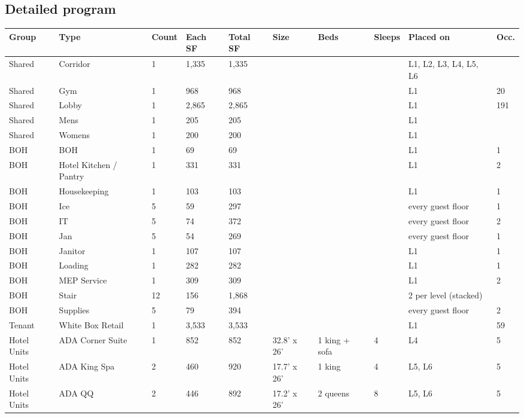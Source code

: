 \documentclass[10pt]{article}
\begin{document}
\subsection{Detailed program}
{\small \begin{longtable}{p{1.4cm}p{3.0cm}p{0.8cm}p{1.0cm}p{1.1cm}p{1.6cm}p{1.6cm}p{0.9cm}p{2.2cm}p{0.7cm}}
\toprule
\textbf{Group} & \textbf{Type} & \textbf{Count} & \textbf{Each SF} & \textbf{Total SF} & \textbf{Size} & \textbf{Beds} & \textbf{Sleeps} & \textbf{Placed on} & \textbf{Occ.} \\ \midrule \endhead
Shared & Corridor & 1 & 1,335 & 1,335 &  &  &  & L1, L2, L3, L4, L5, L6 &  \\
Shared & Gym & 1 & 968 & 968 &  &  &  & L1 & 20 \\
Shared & Lobby & 1 & 2,865 & 2,865 &  &  &  & L1 & 191 \\
Shared & Mens & 1 & 205 & 205 &  &  &  & L1 &  \\
Shared & Womens & 1 & 200 & 200 &  &  &  & L1 &  \\
BOH & BOH & 1 & 69 & 69 &  &  &  & L1 & 1 \\
BOH & Hotel Kitchen / Pantry & 1 & 331 & 331 &  &  &  & L1 & 2 \\
BOH & Housekeeping & 1 & 103 & 103 &  &  &  & L1 & 1 \\
BOH & Ice & 5 & 59 & 297 &  &  &  & every guest floor & 1 \\
BOH & IT & 5 & 74 & 372 &  &  &  & every guest floor & 2 \\
BOH & Jan & 5 & 54 & 269 &  &  &  & every guest floor & 1 \\
BOH & Janitor & 1 & 107 & 107 &  &  &  & L1 & 1 \\
BOH & Loading & 1 & 282 & 282 &  &  &  & L1 & 1 \\
BOH & MEP Service & 1 & 309 & 309 &  &  &  & L1 & 2 \\
BOH & Stair & 12 & 156 & 1,868 &  &  &  & 2 per level (stacked) &  \\
BOH & Supplies & 5 & 79 & 394 &  &  &  & every guest floor & 2 \\
Tenant & White Box Retail & 1 & 3,533 & 3,533 &  &  &  & L1 & 59 \\
Hotel Units & ADA Corner Suite & 1 & 852 & 852 & 32.8' x 26' & 1 king + sofa & 4 & L4 & 5 \\
Hotel Units & ADA King Spa & 2 & 460 & 920 & 17.7' x 26' & 1 king & 4 & L5, L6 & 5 \\
Hotel Units & ADA QQ & 2 & 446 & 892 & 17.2' x 26' & 2 queens & 8 & L5, L6 & 5 \\

\end{longtable}}
\end{document}

